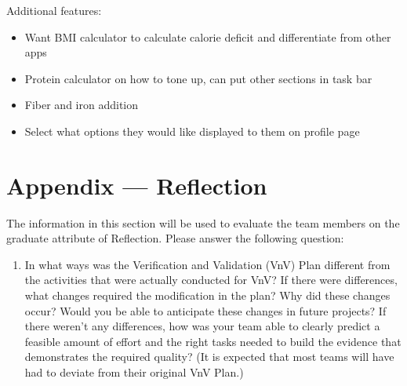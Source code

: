 \documentclass[12pt, titlepage]{article}
\begin{document}
	Additional features:
	\begin{itemize}
		\item Want BMI calculator to calculate calorie deficit and differentiate from other apps
		\item Protein calculator on how to tone up, can put other sections in task bar
		\item Fiber and iron addition
		\item Select what options they would like displayed to them on profile page
	\end{itemize}
	
	
	
	
	\newpage{}
	\section*{Appendix --- Reflection}
	
	The information in this section will be used to evaluate the team members 
	on the
	graduate attribute of Reflection.  Please answer the following question:
	
	\begin{enumerate}
		\item In what ways was the Verification and Validation (VnV) Plan 
		different
		from the activities that were actually conducted for VnV?  If there were
		differences, what changes required the modification in the plan?  Why 
		did
		these changes occur?  Would you be able to anticipate these changes in 
		future
		projects?  If there weren't any differences, how was your team able to 
		clearly
		predict a feasible amount of effort and the right tasks needed to build 
		the
		evidence that demonstrates the required quality?  (It is expected that 
		most
		teams will have had to deviate from their original VnV Plan.)
	\end{enumerate}
	
\end{document}
